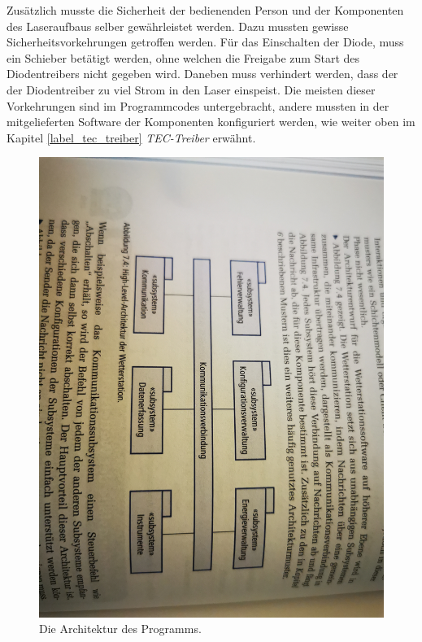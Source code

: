 Zusätzlich musste die Sicherheit der bedienenden Person und der Komponenten des Laseraufbaus selber gewährleistet werden. Dazu mussten gewisse Sicherheitsvorkehrungen getroffen werden. Für das Einschalten der Diode, muss ein Schieber betätigt werden, ohne welchen die Freigabe zum Start des Diodentreibers nicht gegeben wird. Daneben muss verhindert werden, dass der der Diodentreiber zu viel Strom in den Laser einspeist. Die meisten dieser Vorkehrungen sind im Programmcodes untergebracht, andere mussten in der mitgelieferten Software der Komponenten konfiguriert werden, wie weiter oben im Kapitel \ref{label_tec_treiber} \textit{TEC-Treiber} erwähnt.

\begin{figure}[H]
    \centering
    \includegraphics[scale=0.08, angle=90]{98_images/high_level_architecture.jpg}
    \caption{Die Architektur des Programms.}
    \label{fig:architecture}
\end{figure}

